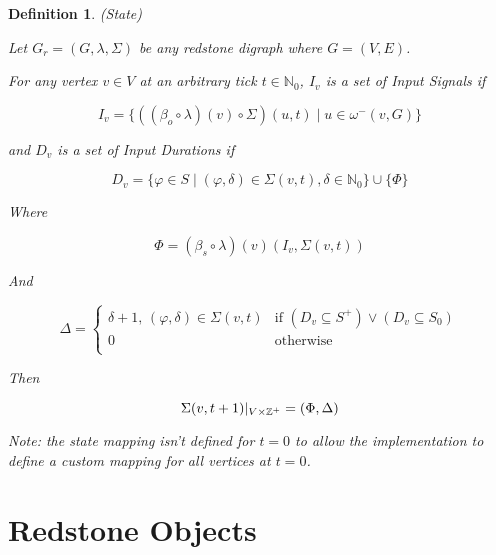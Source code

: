 \documentclass{article}
\newtheorem{defn}{Definition}[section]
\begin{document}
\begin{defn} (State)

Let \(G_{r} = (G, \lambda, \Sigma)\) be any redstone digraph where \(G = (V, E)\).

For any vertex \(v \in V\) at an arbitrary tick \(t \in \mathbb{N}_{0}\), \(I_{v}\) is a set of Input Signals 
if

\begin{equation*}
	I_{v} = \{ ((\beta_{o} \circ \lambda)(v) \circ \Sigma)(u, t) \mid u \in \omega^-(v, G)  \}
\end{equation*}

and \(D_{v}\) is a set of Input Durations if

\begin{equation}
	D_{v} = \{\varphi \in S \mid (\varphi, \delta) \in \Sigma(v, t), \delta \in \mathbb{N}_{0}\} \cup \{\Phi\}
\end{equation}

Where

\begin{equation}
	\Phi = (\beta_{s} \circ \lambda)(v)(I_{v}, \Sigma(v, t))
\end{equation}

And

\begin{equation}
	\Delta = 
	\begin{cases}
		\delta + 1,\, (\varphi, \delta) \in \Sigma(v, t) & \text{if } (D_{v} \subseteq S^+) \vee (D_{v} \subseteq S_{0})\\	
		0 & \text{otherwise} \\	
	\end{cases}
\end{equation}

Then

\begin{equation}
	\Sigma(v, t + 1)|_{V \times \mathbb{Z}^+} = (\Phi, \Delta) \\
\end{equation}

Note: the state mapping isn't defined for \(t = 0\) to allow the implementation to define a custom mapping for all 
vertices at \(t = 0\).

\end{defn}

\section{Redstone Objects}
\end{document}
